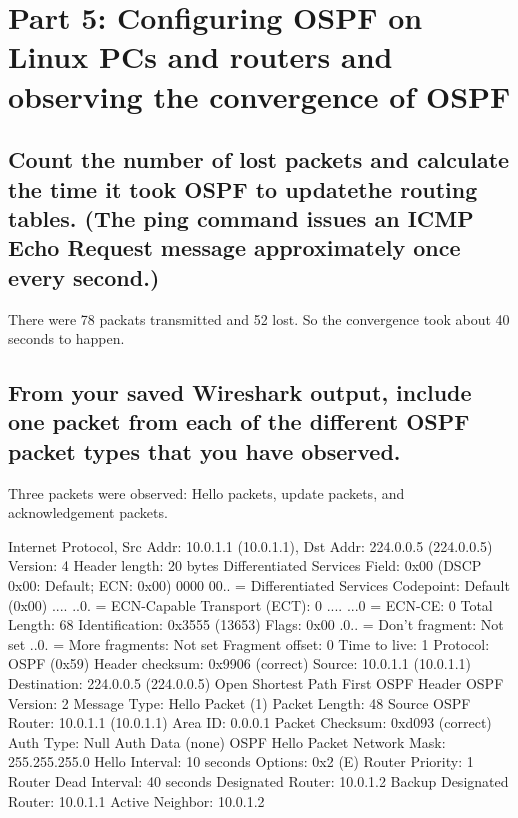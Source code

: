 \documentclass[a4paper, 11pt]{article}
\begin{document}
\section{Part 5: Configuring OSPF on Linux PCs and routers and observing the convergence of OSPF}

\subsection{Count the number of lost packets and calculate the time it took OSPF to updatethe routing tables. (The ping command issues an ICMP Echo Request message approximately once every second.) }

There were 78 packats transmitted and 52 lost. So the convergence took about 40 seconds to happen.

\subsection{From your saved Wireshark output, include one packet from each of the different OSPF packet types that you have observed. }

Three packets were observed: Hello packets, update packets, and acknowledgement packets.

Internet Protocol, Src Addr: 10.0.1.1 (10.0.1.1), Dst Addr: 224.0.0.5 (224.0.0.5)
    Version: 4
    Header length: 20 bytes
    Differentiated Services Field: 0x00 (DSCP 0x00: Default; ECN: 0x00)
        0000 00.. = Differentiated Services Codepoint: Default (0x00)
        .... ..0. = ECN-Capable Transport (ECT): 0
        .... ...0 = ECN-CE: 0
    Total Length: 68
    Identification: 0x3555 (13653)
    Flags: 0x00
        .0.. = Don't fragment: Not set
        ..0. = More fragments: Not set
    Fragment offset: 0
    Time to live: 1
    Protocol: OSPF (0x59)
    Header checksum: 0x9906 (correct)
    Source: 10.0.1.1 (10.0.1.1)
    Destination: 224.0.0.5 (224.0.0.5)
Open Shortest Path First
    OSPF Header
        OSPF Version: 2
        Message Type: Hello Packet (1)
        Packet Length: 48
        Source OSPF Router: 10.0.1.1 (10.0.1.1)
        Area ID: 0.0.0.1
        Packet Checksum: 0xd093 (correct)
        Auth Type: Null
        Auth Data (none)
    OSPF Hello Packet
        Network Mask: 255.255.255.0
        Hello Interval: 10 seconds
        Options: 0x2 (E)
        Router Priority: 1
        Router Dead Interval: 40 seconds
        Designated Router: 10.0.1.2
Backup Designated Router: 10.0.1.1
        Active Neighbor: 10.0.1.2
\end{document}
